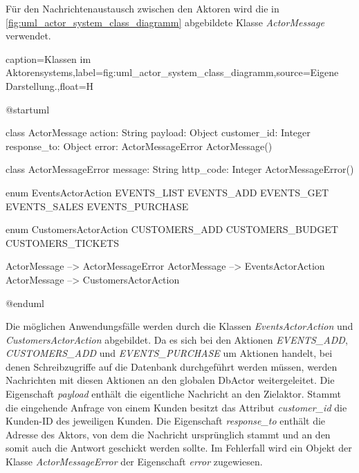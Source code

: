Für den Nachrichtenaustausch zwischen den Aktoren wird die in \autoref{fig:uml_actor_system_class_diagramm} abgebildete Klasse \textit{ActorMessage} verwendet.

\begin{dhbwfigure}{caption=Klassen im Aktorensystems,label=fig:uml_actor_system_class_diagramm,source={Eigene Darstellung.},float=H}
    \begin{plantuml}
        @startuml

        class ActorMessage {
            action: String
            payload: Object 
            customer_id: Integer
            response_to: Object
            error: ActorMessageError
            ActorMessage()
        }

        class ActorMessageError {
            message: String
            http_code: Integer 
            ActorMessageError()
        }

        enum EventsActorAction {
            EVENTS_LIST
            EVENTS_ADD
            EVENTS_GET
            EVENTS_SALES
            EVENTS_PURCHASE
        }

        enum CustomersActorAction {
            CUSTOMERS_ADD
            CUSTOMERS_BUDGET
            CUSTOMERS_TICKETS
        }

        ActorMessage --> ActorMessageError
        ActorMessage --> EventsActorAction
        ActorMessage --> CustomersActorAction

        @enduml
    \end{plantuml}
\end{dhbwfigure}\unskip

Die möglichen Anwendungsfälle werden durch die Klassen \textit{EventsActorAction} und \textit{CustomersActorAction} abgebildet.
Da es sich bei den Aktionen \textit{EVENTS\_ADD}, \textit{CUSTOMERS\_ADD} und \textit{EVENTS\_PURCHASE} um Aktionen handelt, bei denen Schreibzugriffe auf die Datenbank durchgeführt werden müssen, werden Nachrichten mit diesen Aktionen an den globalen DbActor weitergeleitet.
Die Eigenschaft \textit{payload} enthält die eigentliche Nachricht an den Zielaktor.
Stammt die eingehende Anfrage von einem Kunden besitzt das Attribut \textit{customer\_id} die Kunden-ID des jeweiligen Kunden.
Die Eigenschaft \textit{response\_to} enthält die Adresse des Aktors, von dem die Nachricht ursprünglich stammt und an den somit auch die Antwort geschickt werden sollte.
Im Fehlerfall wird ein Objekt der Klasse \textit{ActorMessageError} der Eigenschaft \textit{error} zugewiesen.
